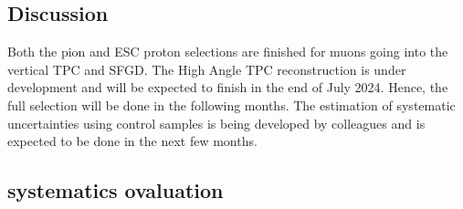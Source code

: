             

    \subsection{Discussion}
        Both the pion and ESC proton selections are finished for muons going into the vertical TPC and SFGD. The High Angle TPC reconstruction is under development and will be expected to finish in the end of July 2024. Hence, the full selection will be done in the following months. The estimation of systematic uncertainties using control samples is being developed by colleagues and is expected to be done in the next few months. 


     \subsection{systematics ovaluation}
          